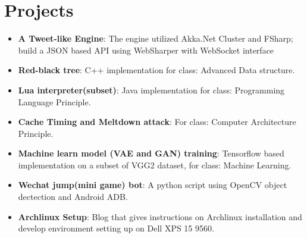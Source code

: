 \documentclass[letterpaper,12pt]{article}
\newcommand{\resumeItem}[2]{
  \item\small{
    \textbf{#1}{: #2 \vspace{-2pt}}
  }
}
\newcommand{\resumeSubItem}[2]{\resumeItem{#1}{#2}\vspace{-4pt}}
\newcommand{\resumeSubHeadingListStart}{\begin{itemize}[leftmargin=*]}
\newcommand{\resumeSubHeadingListEnd}{\end{itemize}}
\begin{document}
\section{Projects}
  \resumeSubHeadingListStart
    \resumeSubItem{A Tweet-like Engine}{The engine utilized Akka.Net Cluster and FSharp; build a JSON based API using WebSharper with WebSocket interface}
    \resumeSubItem{Red-black tree}{C++ implementation for class: Advanced Data structure. }
    \resumeSubItem{Lua interpreter(subset)}{Java implementation for class: Programming Language Principle.}
    \resumeSubItem{Cache Timing and Meltdown attack}{For class: Computer Architecture Principle.}
    \resumeSubItem{Machine learn model (VAE and GAN) training}{Tensorflow based implementation on a subset of VGG2 dataset, for class: Machine Learning.}
    \resumeSubItem{Wechat jump(mini game) bot}{A python script using OpenCV object dectection and Android ADB.}
    \resumeSubItem{Archlinux Setup}{Blog that gives instructions on Archlinux installation and develop environment setting up on Dell XPS 15 9560.}
  \resumeSubHeadingListEnd

%


\end{document}
